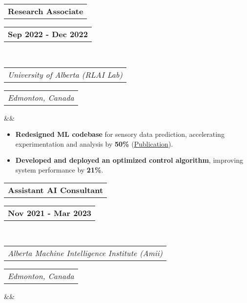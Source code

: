 \documentclass[11pt,a4paper,roman,colorlinks,linkcolor=blue,filecolor=magenta,urlcolor=cyan]{moderncv}        %
\makeatletter
\newcommand*{\customcventry}[7][.25em]{
  \begin{tabular}{@{}l} 
    {\bfseries #4}
  \end{tabular}
  \hfill%
  \begin{tabular}{l@{}}
     {\bfseries #5}
  \end{tabular} \\
  \begin{tabular}{@{}l} 
    {\itshape #3}
  \end{tabular}
  \hfill%
  \begin{tabular}{l@{}}
     {\itshape #2}
  \end{tabular}
  \ifx&#7&%
  \else{\\%
    \begin{minipage}{\maincolumnwidth}%
      \small#7%
    \end{minipage}}\fi%
  \par\addvspace{#1}}
\makeatother
\begin{document}
{\customcventry{Edmonton, Canada}{University of Alberta (RLAI Lab)}{Research Associate}{Sep 2022 - Dec 2022}{}{}
}
\begin{itemize}
    \item \textbf{Redesigned ML codebase} for sensory data prediction, accelerating experimentation and analysis by \textbf{50\%} (\href{https://link.springer.com/article/10.1007/s10994-023-06413-x}{Publication}).
    \item \textbf{Developed and deployed an optimized control algorithm}, improving system performance by \textbf{21\%}.
\end{itemize}

{\customcventry{Edmonton, Canada}{Alberta Machine Intelligence Institute (Amii)}{Assistant AI Consultant}{Nov 2021 - Mar 2023}{}{}
}
\end{document}
